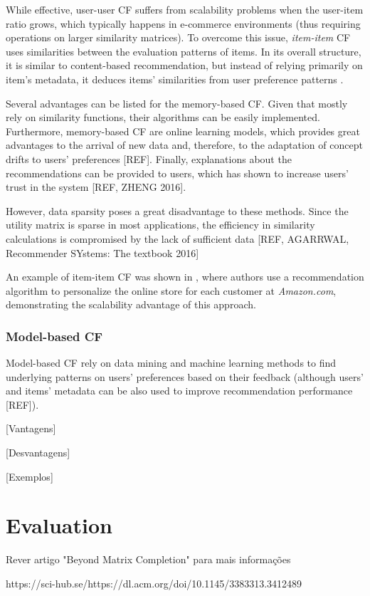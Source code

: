     While effective, user-user CF suffers from scalability problems when the user-item ratio grows, which typically happens in e-commerce environments (thus requiring operations on larger similarity matrices). To overcome this issue, \textit{item-item} CF uses similarities between the evaluation patterns of items. In its overall structure, it is similar to content-based recommendation, but instead of relying primarily on item's metadata, it deduces items' similarities from user preference patterns \cite{2001sarwar}.

    Several advantages can be listed for the memory-based CF. Given that mostly rely on similarity     functions, their algorithms can be easily implemented. Furthermore, memory-based CF are online     learning models, which provides great advantages to the arrival of new data and, therefore, to the adaptation of concept drifts to users' preferences [REF]. Finally, explanations about the     recommendations can be provided to users, which has shown to increase users' trust in the system     [REF, ZHENG 2016].

    However, data sparsity poses a great disadvantage to these methods. Since the utility matrix is 
    sparse in most applications, the efficiency in similarity calculations is compromised by the lack 
    of sufficient data [REF, AGARRWAL, Recommender SYstems: The textbook 2016]
    
    An example of item-item CF was shown in \cite{2003amazon}, where authors use a recommendation 
    algorithm to personalize the online store for each customer at \textit{Amazon.com}, demonstrating 
    the scalability advantage of this approach.

  \subsubsection{Model-based CF}

  Model-based CF rely on data mining and machine learning methods to find underlying patterns on 
  users' preferences based on their feedback (although users' and items' metadata can be also used to 
  improve recommendation performance [REF]). 

  [Vantagens]

  [Desvantagens]

  [Exemplos]




\section{Evaluation}

Rever artigo "Beyond Matrix Completion" para mais informações

https://sci-hub.se/https://dl.acm.org/doi/10.1145/3383313.3412489